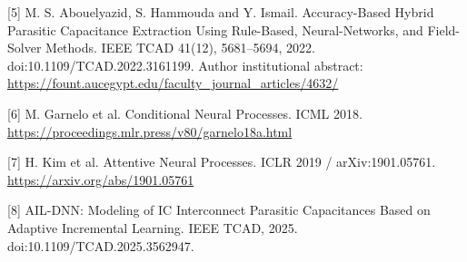 \documentclass[10pt,twocolumn]{article}
\begin{document}
[5] M. S. Abouelyazid, S. Hammouda and Y. Ismail. Accuracy-Based Hybrid Parasitic Capacitance Extraction Using Rule-Based, Neural-Networks, and Field-Solver Methods. IEEE TCAD 41(12), 5681--5694, 2022. doi:10.1109/TCAD.2022.3161199. Author institutional abstract: \url{https://fount.aucegypt.edu/faculty_journal_articles/4632/}

[6] M. Garnelo et al. Conditional Neural Processes. ICML 2018. \url{https://proceedings.mlr.press/v80/garnelo18a.html}

[7] H. Kim et al. Attentive Neural Processes. ICLR 2019 / arXiv:1901.05761. \url{https://arxiv.org/abs/1901.05761}

[8] AIL-DNN: Modeling of IC Interconnect Parasitic Capacitances Based on Adaptive Incremental Learning. IEEE TCAD, 2025. doi:10.1109/TCAD.2025.3562947.
\end{document}
